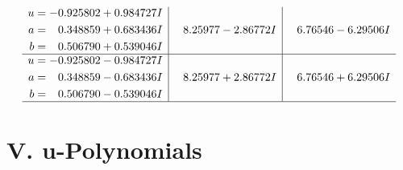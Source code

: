 \documentclass[1p]{elsarticle_modified}
\theoremstyle{definition}
\begin{document}
$$\begin{array}{c|c|c}
\begin{aligned}
u &= -0.925802 + 0.984727 I \\
a &= \phantom{-}0.348859 + 0.683436 I \\
b &= \phantom{-}0.506790 + 0.539046 I\end{aligned}
 & \phantom{-}8.25977 - 2.86772 I & \phantom{-}6.76546 - 6.29506 I \\ \hline\begin{aligned}
u &= -0.925802 - 0.984727 I \\
a &= \phantom{-}0.348859 - 0.683436 I \\
b &= \phantom{-}0.506790 - 0.539046 I\end{aligned}
 & \phantom{-}8.25977 + 2.86772 I & \phantom{-}6.76546 + 6.29506 I\\
 \hline 
 \end{array}$$\newpage
\newpage\renewcommand{\arraystretch}{1}
\centering \section*{ V. u-Polynomials}
\end{document}
